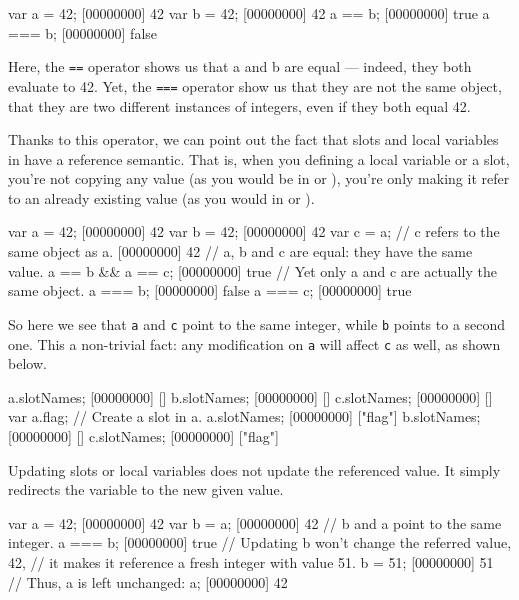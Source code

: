 \begin{urbiscript}
var a = 42;
[00000000] 42
var b = 42;
[00000000] 42
a == b;
[00000000] true
a === b;
[00000000] false
\end{urbiscript}

Here, the \lstinline{==} operator shows us that a and b are equal ---
indeed, they both evaluate to 42. Yet, the \lstinline{===} operator show
us that they are not the same object, that they are two different
instances of integers, even if they both equal 42.

Thanks to this operator, we can point out the fact that slots and
local variables in \us have a reference semantic. That is, when you
defining a local variable or a slot, you're not copying any value (as
you would be in \C or \Cxx), you're only making it refer to an already
existing value (as you would in \ruby or \java).

\begin{urbiscript}
var a = 42;
[00000000] 42
var b = 42;
[00000000] 42
var c = a; // c refers to the same object as a.
[00000000] 42
// a, b and c are equal: they have the same value.
a == b && a == c;
[00000000] true
// Yet only a and c are actually the same object.
a === b;
[00000000] false
a === c;
[00000000] true
\end{urbiscript}

So here we see that \lstinline|a| and \lstinline|c| point to the same
integer, while \lstinline|b| points to a second one. This a
non-trivial fact: any modification on \lstinline|a| will affect
\lstinline|c| as well, as shown below.

\begin{urbiscript}
a.slotNames;
[00000000] []
b.slotNames;
[00000000] []
c.slotNames;
[00000000] []
var a.flag; // Create a slot in a.
a.slotNames;
[00000000] ["flag"]
b.slotNames;
[00000000] []
c.slotNames;
[00000000] ["flag"]
\end{urbiscript}

Updating slots or local variables does not update the referenced
value. It simply redirects the variable to the new given value.

\begin{urbiscript}
var a = 42;
[00000000] 42
var b = a;
[00000000] 42
// b and a point to the same integer.
a === b;
[00000000] true
// Updating b won't change the referred value, 42,
// it makes it reference a fresh integer with value 51.
b = 51;
[00000000] 51
// Thus, a is left unchanged:
a;
[00000000] 42
\end{urbiscript}

